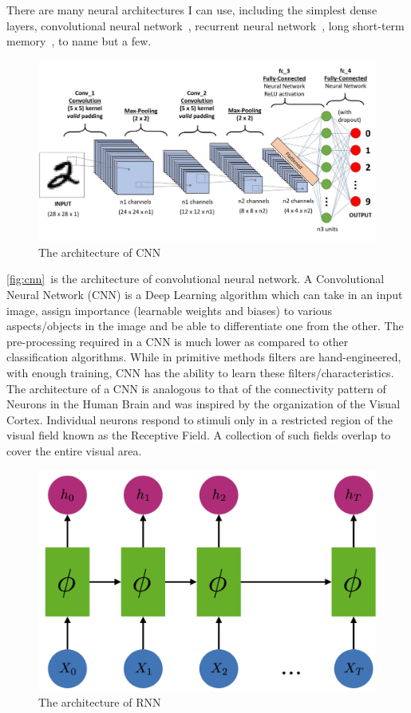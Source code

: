 There are many neural architectures I can use, including the simplest dense layers, convolutional neural network~\cite{albawi2017understanding}, recurrent neural network~\cite{tarwani2017survey}, long short-term memory~\cite{skovajsova2017long}, to name but a few.

\begin{figure}[ht]
\centering
\includegraphics[width=0.9\linewidth]{cnn-big}
\caption{The architecture of CNN}
\label{fig:cnn}
\end{figure}

\autoref{fig:cnn}~is the architecture of convolutional neural network.
A Convolutional Neural Network (CNN) is a Deep Learning algorithm which can take in an input image, assign importance (learnable weights and biases) to various aspects/objects in the image and be able to differentiate one from the other. The pre-processing required in a CNN is much lower as compared to other classification algorithms. While in primitive methods filters are hand-engineered, with enough training, CNN has the ability to learn these filters/characteristics.
The architecture of a CNN is analogous to that of the connectivity pattern of Neurons in the Human Brain and was inspired by the organization of the Visual Cortex. Individual neurons respond to stimuli only in a restricted region of the visual field known as the Receptive Field. A collection of such fields overlap to cover the entire visual area.


\begin{figure}[ht]
\centering
\includegraphics[width=0.7\linewidth]{rnn-big}
\caption{The architecture of RNN}
\label{fig:rnn}
\end{figure}

